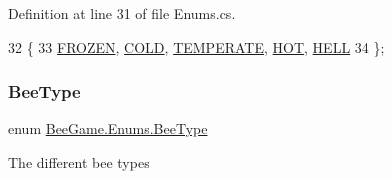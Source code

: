 Definition at line 31 of file Enums.\+cs.


\begin{DoxyCode}
32     \{
33         \hyperlink{namespace_bee_game_1_1_enums_a9db0f9ac859fab168654d657f248b024a081912e034fd835fdda076251f2cd586}{FROZEN}, \hyperlink{namespace_bee_game_1_1_enums_a9db0f9ac859fab168654d657f248b024a3f7ff4daa99912d1b0c8c64340edb9fb}{COLD}, \hyperlink{namespace_bee_game_1_1_enums_a9db0f9ac859fab168654d657f248b024ad5938597ebb26919bd3b131a5f076b35}{TEMPERATE}, \hyperlink{namespace_bee_game_1_1_enums_a9db0f9ac859fab168654d657f248b024ac429fde8b1b986d42f84ba63dbfef6ac}{HOT}, \hyperlink{namespace_bee_game_1_1_enums_a9db0f9ac859fab168654d657f248b024a5fa58915fea0b7f3e0f1e8ec558a9123}{HELL}
34     \};
\end{DoxyCode}
\mbox{\label{namespace_bee_game_1_1_enums_a9376a1582db99d20c756e24de728944f}} 
\subsubsection{\texorpdfstring{Bee\+Type}{BeeType}}
{\footnotesize\ttfamily enum \hyperlink{namespace_bee_game_1_1_enums_a9376a1582db99d20c756e24de728944f}{Bee\+Game.\+Enums.\+Bee\+Type}\hspace{0.3cm}{\ttfamily [strong]}}



The different bee types 

